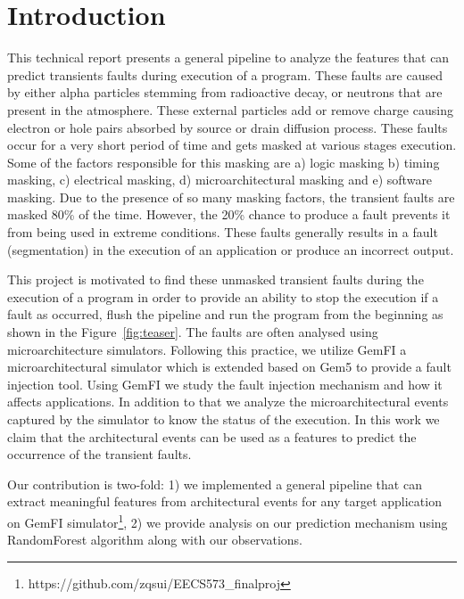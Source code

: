 \section{Introduction}
This technical report presents a general pipeline to analyze the features that can predict transients faults during execution of a program. These faults are caused by either alpha particles stemming from radioactive decay, or neutrons that are present in the atmosphere. These external particles add or remove charge causing electron or hole pairs absorbed by source or drain diffusion process. These faults occur for a very short period of time and gets masked at various stages execution. Some of the factors responsible for this masking are a) logic masking b) timing masking, c) electrical masking, d) microarchitectural masking and e) software masking. Due to the presence of so many masking factors, the transient faults are masked 80\% of the time. However, the 20\% chance to produce a fault prevents it from being used in extreme conditions. These faults generally results in a fault (segmentation) in the execution of an application or produce an incorrect output.

This project is motivated to find these unmasked transient faults during the execution of a program in order to provide an ability to stop the execution if a fault as occurred, flush the pipeline and run the program from the beginning as shown in the Figure~\ref{fig:teaser}. The faults are often analysed using microarchitecture simulators. Following this practice, we utilize GemFI \cite{parasyris2014gemfi} a microarchitectural simulator which is extended based on Gem5 \cite{Binkert:2011:GS:2024716.2024718} to provide a fault injection tool. Using GemFI we study the fault injection mechanism and how it affects applications. In addition to that we analyze the microarchitectural events captured by the simulator to know the status of the execution. In this work we claim that the architectural events can be used as a features to predict the occurrence of the transient faults.

Our contribution is two-fold: 1) we implemented a general pipeline that can extract meaningful features from architectural events for any target application on GemFI simulator\footnote{https://github.com/zqsui/EECS573\_finalproj}, 2) we provide analysis on our prediction mechanism using RandomForest \cite{breiman2001random} algorithm along with our observations.

